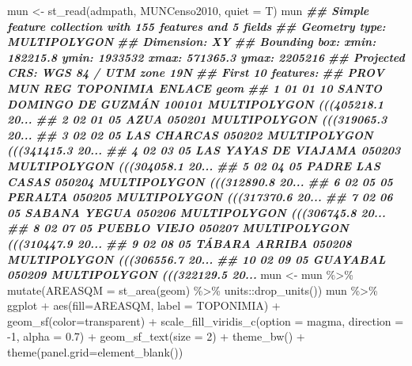 \documentclass[10pt,landscape,a3paper]{article}
\newenvironment{Shaded}{\begin{snugshade}}{\end{snugshade}}
\newcommand{\AttributeTok}[1]{\textcolor[rgb]{0.77,0.63,0.00}{#1}}
\newcommand{\DecValTok}[1]{\textcolor[rgb]{0.00,0.00,0.81}{#1}}
\newcommand{\DocumentationTok}[1]{\textcolor[rgb]{0.56,0.35,0.01}{\textbf{\textit{#1}}}}
\newcommand{\FloatTok}[1]{\textcolor[rgb]{0.00,0.00,0.81}{#1}}
\newcommand{\FunctionTok}[1]{\textcolor[rgb]{0.00,0.00,0.00}{#1}}
\newcommand{\NormalTok}[1]{#1}
\newcommand{\OtherTok}[1]{\textcolor[rgb]{0.56,0.35,0.01}{#1}}
\newcommand{\SpecialCharTok}[1]{\textcolor[rgb]{0.00,0.00,0.00}{#1}}
\newcommand{\StringTok}[1]{\textcolor[rgb]{0.31,0.60,0.02}{#1}}
\begin{document}
\begin{Shaded}
\begin{Highlighting}[]
\NormalTok{mun }\OtherTok{\textless{}{-}} \FunctionTok{st\_read}\NormalTok{(admpath, }\StringTok{\textquotesingle{}MUNCenso2010\textquotesingle{}}\NormalTok{, }\AttributeTok{quiet =}\NormalTok{ T)}
\NormalTok{mun}
\DocumentationTok{\#\# Simple feature collection with 155 features and 5 fields}
\DocumentationTok{\#\# Geometry type: MULTIPOLYGON}
\DocumentationTok{\#\# Dimension:     XY}
\DocumentationTok{\#\# Bounding box:  xmin: 182215.8 ymin: 1933532 xmax: 571365.3 ymax: 2205216}
\DocumentationTok{\#\# Projected CRS: WGS 84 / UTM zone 19N}
\DocumentationTok{\#\# First 10 features:}
\DocumentationTok{\#\#    PROV MUN REG               TOPONIMIA ENLACE                           geom}
\DocumentationTok{\#\# 1    01  01  10 SANTO DOMINGO DE GUZMÁN 100101 MULTIPOLYGON (((405218.1 20...}
\DocumentationTok{\#\# 2    02  01  05                    AZUA 050201 MULTIPOLYGON (((319065.3 20...}
\DocumentationTok{\#\# 3    02  02  05             LAS CHARCAS 050202 MULTIPOLYGON (((341415.3 20...}
\DocumentationTok{\#\# 4    02  03  05    LAS YAYAS DE VIAJAMA 050203 MULTIPOLYGON (((304058.1 20...}
\DocumentationTok{\#\# 5    02  04  05         PADRE LAS CASAS 050204 MULTIPOLYGON (((312890.8 20...}
\DocumentationTok{\#\# 6    02  05  05                 PERALTA 050205 MULTIPOLYGON (((317370.6 20...}
\DocumentationTok{\#\# 7    02  06  05            SABANA YEGUA 050206 MULTIPOLYGON (((306745.8 20...}
\DocumentationTok{\#\# 8    02  07  05            PUEBLO VIEJO 050207 MULTIPOLYGON (((310447.9 20...}
\DocumentationTok{\#\# 9    02  08  05           TÁBARA ARRIBA 050208 MULTIPOLYGON (((306556.7 20...}
\DocumentationTok{\#\# 10   02  09  05                GUAYABAL 050209 MULTIPOLYGON (((322129.5 20...}
\NormalTok{mun }\OtherTok{\textless{}{-}}\NormalTok{ mun }\SpecialCharTok{\%\textgreater{}\%} \FunctionTok{mutate}\NormalTok{(}\AttributeTok{AREASQM =} \FunctionTok{st\_area}\NormalTok{(geom) }\SpecialCharTok{\%\textgreater{}\%}\NormalTok{ units}\SpecialCharTok{::}\FunctionTok{drop\_units}\NormalTok{())}
\NormalTok{mun }\SpecialCharTok{\%\textgreater{}\%}\NormalTok{ ggplot }\SpecialCharTok{+} \FunctionTok{aes}\NormalTok{(}\AttributeTok{fill=}\NormalTok{AREASQM, }\AttributeTok{label =}\NormalTok{ TOPONIMIA) }\SpecialCharTok{+}
  \FunctionTok{geom\_sf}\NormalTok{(}\AttributeTok{color=}\StringTok{\textquotesingle{}transparent\textquotesingle{}}\NormalTok{) }\SpecialCharTok{+}
  \FunctionTok{scale\_fill\_viridis\_c}\NormalTok{(}\AttributeTok{option =} \StringTok{\textquotesingle{}magma\textquotesingle{}}\NormalTok{, }\AttributeTok{direction =} \SpecialCharTok{{-}}\DecValTok{1}\NormalTok{, }\AttributeTok{alpha =} \FloatTok{0.7}\NormalTok{) }\SpecialCharTok{+}
  \FunctionTok{geom\_sf\_text}\NormalTok{(}\AttributeTok{size =} \DecValTok{2}\NormalTok{) }\SpecialCharTok{+}
  \FunctionTok{theme\_bw}\NormalTok{() }\SpecialCharTok{+}
  \FunctionTok{theme}\NormalTok{(}\AttributeTok{panel.grid=}\FunctionTok{element\_blank}\NormalTok{())}
\end{Highlighting}
\end{Shaded}
\end{document}
